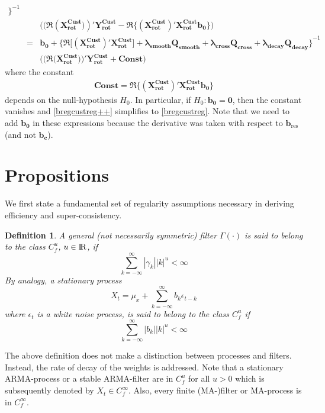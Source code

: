 \documentclass[11pt]{article}
\newtheorem{Definition}{Definition}
\begin{document}
\begin{appendix}
\begin{eqnarray}
{\Big\}}^{-1}\nonumber\\
&&\Big((\Re(\mathbf{X_{\textrm{rot}}^{\textrm{Cust}})})'
\mathbf{Y_{\textrm{rot}}^{\textrm{Cust}}}-\Re\bigg\{(\mathbf{X_{\textrm{rot}}^{\textrm{Cust}}})'\mathbf{X_{\textrm{rot}}^{\textrm{Cust}}b_0}\bigg\}
\Big)\nonumber\\
&=&\mathbf{b_0}+\mathbf{\Big\{\Re\Big[(X_{\textrm{rot}}^{\textrm{Cust} })' X_{\textrm{rot}}^{\textrm{Cust}}\Big]+
\lambda_{\textrm{smooth}}\mathbf{Q_{smooth}}+\lambda_{\textrm{cross}}\mathbf{Q_{cross}}+\lambda_{\textrm{decay}}\mathbf{Q_{decay}}
\Big\}}^{-1}\nonumber\\
&&\Big((\Re(\mathbf{X_{\textrm{rot}}^{\textrm{Cust}}))}'
\mathbf{Y_{\textrm{rot}}^{\textrm{Cust}}}+\mathbf{Const}\Big)
\end{eqnarray}
where the constant
\begin{eqnarray*}
\mathbf{Const}=\Re\bigg\{(\mathbf{X_{\textrm{rot}}^{\textrm{Cust}}})'\mathbf{X_{\textrm{rot}}^{\textrm{Cust}}b_0}\bigg\}
\end{eqnarray*}
depends on the null-hypothesis $H_0$. In particular, if $H_0: \mathbf{b_0=0}$, then the constant vanishes and \ref{bregcustreg++} simplifies to \ref{bregcustreg}. Note that we need to add $\mathbf{b_0}$ in these expressions because the derivative was taken with respect to $\mathbf{b}_{\textrm{res}}$ (and not $\mathbf{b_c}$).\\


\section{Propositions}

We first state a fundamental set of regularity assumptions necessary in deriving
efficiency and super-consistency.
\begin{Definition} \label{CMA}
A general (not necessarily symmetric) filter $\Gamma(\cdot)$ is said
to belong to the class \(C_{f}^{u}\),
\(u\in\mbox{I\hspace{-.15em}R}\), if
\[\sum_{k=-\infty}^\infty|\gamma_k|| k|^{u}<\infty\]
By analogy, a stationary process
\begin{equation}
\label{aboma} X_t=\mu_x+\sum_{k=-\infty}^{\infty}b_k\epsilon_{t-k}
\end{equation}
where $\epsilon_t$ is a white noise process, is said to belong to
the class $C_f^u$ if
\[\sum_{k=-\infty}^\infty|b_k|| k|^{u}<\infty\]
\end{Definition}
The above definition does not make a distinction between processes
and filters. Instead, the rate of decay of the weights is addressed.
Note that a stationary ARMA-process or a stable ARMA-filter are in
\(C_f^u\) for all \(u>0\) which is subsequently denoted by \(X_t\in
C_f^\infty\). Also, every finite (MA-)filter or MA-process is in $C_f^\infty$.\\


\end{appendix}
\end{document}
